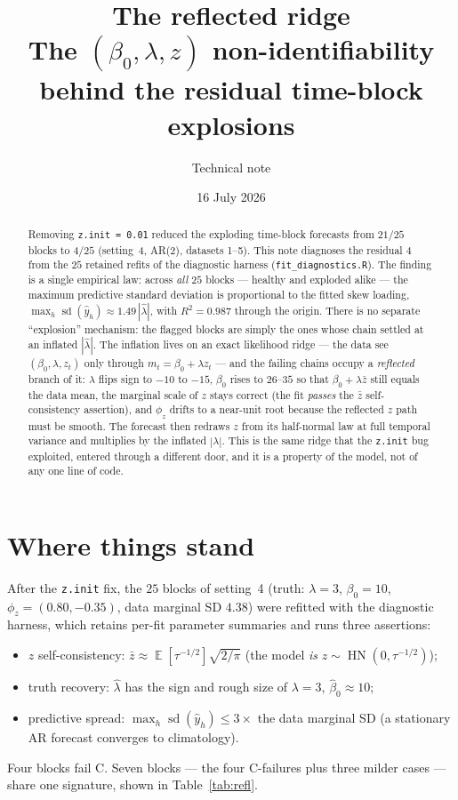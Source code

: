 \documentclass[11pt]{article}
\title{\textbf{The reflected ridge}\\[2pt]
\large The $(\beta_0, \lambda, z)$ non-identifiability behind the residual
time-block explosions}
\author{Technical note}
\date{16 July 2026}
\newcommand{\code}[1]{\texttt{#1}}
\DeclareMathOperator{\hn}{HN}
\DeclareMathOperator{\sd}{sd}
\DeclareMathOperator{\E}{\mathbb{E}}
\begin{document}
\maketitle

\begin{abstract}
Removing \code{z.init = 0.01} reduced the exploding time-block forecasts from
$21/25$ blocks to $4/25$ (setting~4, AR(2), datasets 1--5). This note diagnoses
the residual $4$ from the $25$ retained refits of the diagnostic harness
(\code{fit\_diagnostics.R}). The finding is a single empirical law: across
\emph{all} $25$ blocks --- healthy and exploded alike --- the maximum predictive
standard deviation is proportional to the fitted skew loading,
$\max_h \sd(\hat y_h) \approx 1.49\,|\hat\lambda|$, with $R^2 = 0.987$ through
the origin. There is no separate ``explosion'' mechanism: the flagged blocks are
simply the ones whose chain settled at an inflated $|\hat\lambda|$. The
inflation lives on an exact likelihood ridge --- the data see $(\beta_0,
\lambda, z_t)$ only through $m_t = \beta_0 + \lambda z_t$ --- and the failing
chains occupy a \emph{reflected} branch of it: $\lambda$ flips sign to $-10$ to
$-15$, $\beta_0$ rises to $26$--$35$ so that $\beta_0 + \lambda\bar z$ still
equals the data mean, the marginal scale of $z$ stays correct (the fit
\emph{passes} the $\bar z$ self-consistency assertion), and $\phi_z$ drifts to a
near-unit root because the reflected $z$ path must be smooth. The forecast then
redraws $z$ from its half-normal law at full temporal variance and multiplies by
the inflated $|\lambda|$. This is the same ridge that the \code{z.init} bug
exploited, entered through a different door, and it is a property of the model,
not of any one line of code.
\end{abstract}

\section{Where things stand}

After the \code{z.init} fix, the $25$ blocks of setting~4 (truth: $\lambda = 3$,
$\beta_0 = 10$, $\phi_z = (0.80, -0.35)$, data marginal SD $4.38$) were refitted
with the diagnostic harness, which retains per-fit parameter summaries and runs
three assertions:
\begin{itemize}\itemsep1pt
  \item[\textbf{A}] $z$ self-consistency: $\bar z \approx \E[\tau^{-1/2}]\sqrt{2/\pi}$
        (the model \emph{is} $z \sim \hn(0, \tau^{-1/2})$);
  \item[\textbf{B}] truth recovery: $\hat\lambda$ has the sign and rough size of
        $\lambda = 3$, $\hat\beta_0 \approx 10$;
  \item[\textbf{C}] predictive spread: $\max_h \sd(\hat y_h) \le 3 \times$ the
        data marginal SD (a stationary AR forecast converges to climatology).
\end{itemize}
Four blocks fail C. Seven blocks --- the four C-failures plus three milder
cases --- share one signature, shown in Table~\ref{tab:refl}.
\end{document}
